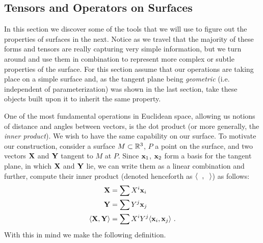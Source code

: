 \subsection{Tensors and Operators on Surfaces}

  In this section we discover some of the tools that we will use to figure out the properties of surfaces in the next. Notice as we travel that the majority of these forms and tensors are really capturing very simple information, but we turn around and use them in combination to represent more complex or subtle properties of the surface. For this section assume that our operations are taking place on a simple surface and, as the tangent plane being \emph{geometric} (i.e. independent of parameterization) was shown in the last section, take these objects built upon it to inherit the same property.

  \begin{unno_rem}
    One of the most fundamental operations in Euclidean space, allowing us notions of distance and angles between vectors, is the dot product (or more generally, the \emph{inner product}). We wish to have the same capability on our surface. To motivate our construction, consider a surface $M \subset \mathbb{R}^3$, $P$ a point on the surface, and two vectors $\mathbf{X}$ and $\mathbf{Y}$ tangent to $M$ at $P$. Since $\mathbf{x}_1$, $\mathbf{x}_2$ form a basis for the tangent plane, in which $\mathbf{X}$ and $\mathbf{Y}$ lie, we can write them as a linear combination and further, compute their inner product (denoted henceforth as $\langle\phantom{x},\phantom{x}\rangle$) as follows:
    \begin{align*}
      \mathbf{X} &= \sum X^i\mathbf{x}_i\\
      \mathbf{Y} &= \sum Y^j\mathbf{x}_j\\
      \langle\mathbf{X}, \mathbf{Y}\rangle &= \sum X^iY^j\langle\mathbf{x}_i, \mathbf{x}_j\rangle \ .
    \end{align*}
    With this in mind we make the following definition.
  \end{unno_rem}

